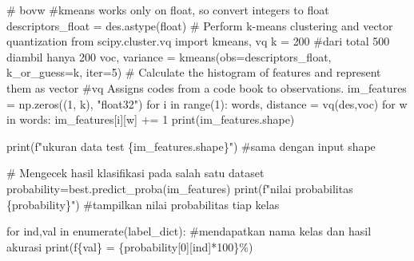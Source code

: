 \documentclass[
  letterpaper,
  DIV=11,
  numbers=noendperiod]{scrreprt}
\newenvironment{Shaded}{\begin{snugshade}}{\end{snugshade}}
\newcommand{\BuiltInTok}[1]{\textcolor[rgb]{0.00,0.23,0.31}{#1}}
\newcommand{\CommentTok}[1]{\textcolor[rgb]{0.37,0.37,0.37}{#1}}
\newcommand{\ControlFlowTok}[1]{\textcolor[rgb]{0.00,0.23,0.31}{#1}}
\newcommand{\DecValTok}[1]{\textcolor[rgb]{0.68,0.00,0.00}{#1}}
\newcommand{\ImportTok}[1]{\textcolor[rgb]{0.00,0.46,0.62}{#1}}
\newcommand{\KeywordTok}[1]{\textcolor[rgb]{0.00,0.23,0.31}{#1}}
\newcommand{\NormalTok}[1]{\textcolor[rgb]{0.00,0.23,0.31}{#1}}
\newcommand{\OperatorTok}[1]{\textcolor[rgb]{0.37,0.37,0.37}{#1}}
\newcommand{\SpecialCharTok}[1]{\textcolor[rgb]{0.37,0.37,0.37}{#1}}
\newcommand{\SpecialStringTok}[1]{\textcolor[rgb]{0.13,0.47,0.30}{#1}}
\newcommand{\StringTok}[1]{\textcolor[rgb]{0.13,0.47,0.30}{#1}}
\begin{document}
\begin{Shaded}
\begin{Highlighting}[]
\CommentTok{\# bovw}
\CommentTok{\#kmeans works only on float, so convert integers to float}
\NormalTok{descriptors\_float }\OperatorTok{=}\NormalTok{ des.astype(}\BuiltInTok{float}\NormalTok{)  }
\CommentTok{\# Perform k{-}means clustering and vector quantization}
\ImportTok{from}\NormalTok{ scipy.cluster.vq }\ImportTok{import}\NormalTok{ kmeans, vq}
\NormalTok{k }\OperatorTok{=} \DecValTok{200}  \CommentTok{\#dari total 500 diambil hanya 200}
\NormalTok{voc, variance }\OperatorTok{=}\NormalTok{ kmeans(obs}\OperatorTok{=}\NormalTok{descriptors\_float, k\_or\_guess}\OperatorTok{=}\NormalTok{k, }\BuiltInTok{iter}\OperatorTok{=}\DecValTok{5}\NormalTok{) }
\CommentTok{\# Calculate the histogram of features and represent them as vector}
\CommentTok{\#vq Assigns codes from a code book to observations.}
\NormalTok{im\_features }\OperatorTok{=}\NormalTok{ np.zeros((}\DecValTok{1}\NormalTok{, k), }\StringTok{"float32"}\NormalTok{)}
\ControlFlowTok{for}\NormalTok{ i }\KeywordTok{in} \BuiltInTok{range}\NormalTok{(}\DecValTok{1}\NormalTok{):}
\NormalTok{    words, distance }\OperatorTok{=}\NormalTok{ vq(des,voc)}
    \ControlFlowTok{for}\NormalTok{ w }\KeywordTok{in}\NormalTok{ words:}
\NormalTok{        im\_features[i][w] }\OperatorTok{+=} \DecValTok{1}
\BuiltInTok{print}\NormalTok{(im\_features.shape)}

\BuiltInTok{print}\NormalTok{(}\SpecialStringTok{f"ukuran data test }\SpecialCharTok{\{}\NormalTok{im\_features}\SpecialCharTok{.}\NormalTok{shape}\SpecialCharTok{\}}\SpecialStringTok{"}\NormalTok{) }\CommentTok{\#sama dengan input shape}

\CommentTok{\# Mengecek hasil klasifikasi pada salah satu dataset}
\NormalTok{probability}\OperatorTok{=}\NormalTok{best.predict\_proba(im\_features)}
\BuiltInTok{print}\NormalTok{(}\SpecialStringTok{f"nilai probabilitas }\SpecialCharTok{\{}\NormalTok{probability}\SpecialCharTok{\}}\SpecialStringTok{"}\NormalTok{) }\CommentTok{\#tampilkan nilai probabilitas tiap kelas}



\ControlFlowTok{for}\NormalTok{ ind,val }\KeywordTok{in} \BuiltInTok{enumerate}\NormalTok{(label\_dict): }\CommentTok{\#mendapatkan nama kelas dan hasil akurasi}
    \BuiltInTok{print}\NormalTok{(}\SpecialStringTok{f\textquotesingle{}}\SpecialCharTok{\{}\NormalTok{val}\SpecialCharTok{\}}\SpecialStringTok{ = }\SpecialCharTok{\{}\NormalTok{probability[}\DecValTok{0}\NormalTok{][ind]}\OperatorTok{*}\DecValTok{100}\SpecialCharTok{\}}\SpecialStringTok{\%\textquotesingle{}}\NormalTok{)}
    

\end{Highlighting}
\end{Shaded}
\end{document}
